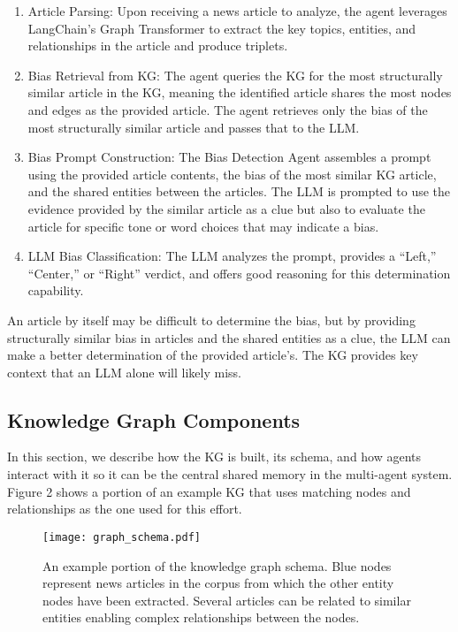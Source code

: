 \documentclass{scrartcl}
\begin{document}
\begin{enumerate}
\item Article Parsing: Upon receiving a news article to analyze, the agent leverages LangChain’s Graph Transformer to extract the key topics, entities, and relationships in the article and produce triplets.
    
    \item Bias Retrieval from KG: The agent queries the KG for the most structurally similar article in the KG, meaning the identified article shares the most nodes and edges as the provided article. The agent retrieves only the bias of the most structurally similar article and passes that to the LLM.
    
    \item Bias Prompt Construction: The Bias Detection Agent assembles a prompt using the provided article contents, the bias of the most similar KG article, and the shared entities between the articles. The LLM is prompted to use the evidence provided by the similar article as a clue but also to evaluate the article for specific tone or word choices that may indicate a bias.
    
    \item  LLM Bias Classification: The LLM analyzes the prompt, provides a “Left,” “Center,” or “Right” verdict, and offers good reasoning for this determination capability.
\end{enumerate}

An article by itself may be difficult to determine the bias, but by providing structurally similar bias in articles and the shared entities as a clue, the LLM can make a better determination of the provided article’s. The KG provides key context that an LLM alone will likely miss.

\subsection{Knowledge Graph Components}
In this section, we describe how the KG is built, its schema, and how agents interact with it so it can be the central shared memory in the multi-agent system. Figure 2 shows a portion of an example KG that uses matching nodes and relationships as the one used for this effort. 
\begin{figure}[h!]
\begin{center}

\hspace*{-2cm}    
\texttt{[image: graph\_schema.pdf]}

\end{center}
\caption{An example portion of the knowledge graph schema. Blue nodes represent news articles in the corpus from which the other entity nodes have been extracted. Several articles can be related to similar entities enabling complex relationships between the nodes.
}
\label{setup}
\end{figure}
\end{document}
